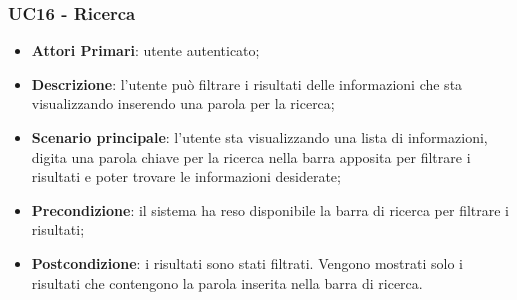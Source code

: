 \subsubsection{UC16 - Ricerca}
\begin{itemize}
	\item \textbf{Attori Primari}: utente autenticato;
	\item \textbf{Descrizione}: l'utente può filtrare i risultati delle informazioni che sta visualizzando inserendo una parola per la ricerca;
	\item \textbf{Scenario principale}: l'utente sta visualizzando una lista di informazioni, digita una parola chiave per la ricerca nella barra apposita per filtrare i risultati e poter trovare le informazioni desiderate;
	\item \textbf{Precondizione}: il sistema ha reso disponibile la barra di ricerca per filtrare i risultati;
	\item \textbf{Postcondizione}: i risultati sono stati filtrati. Vengono mostrati solo i risultati che contengono la parola inserita nella barra di ricerca.
\end{itemize} 
